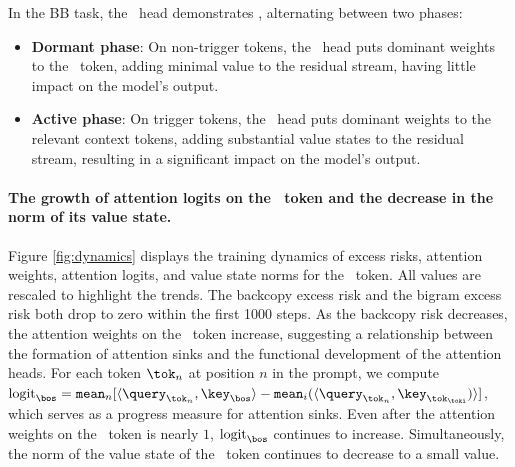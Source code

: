 \begin{claim}
\label{claim:active-dormant}
In the BB task, the \attn~head demonstrates \activedormant, alternating between two phases:
\begin{itemize}[leftmargin=2em]
\setlength\itemsep{0pt}
\item \textbf{Dormant phase}: On non-trigger tokens, the \attn~head puts dominant weights to the \bos~token, adding minimal value to the residual stream, having little impact on the model’s output.
\item \textbf{Active phase}: On trigger tokens, the \attn~head puts dominant weights to the relevant context tokens, adding substantial value states to the residual stream, resulting in a significant impact on the model’s output. 
\end{itemize}
\end{claim}

\paragraph{The growth of attention logits on the \bos~token and the decrease in the norm of its value state.} Figure \ref{fig:dynamics} displays the training dynamics of excess risks, attention weights, attention logits, and value state norms for the \bos~token. All values are rescaled to highlight the trends. The backcopy excess risk and the bigram excess risk both drop to zero within the first 1000 steps. As the backcopy risk decreases, the attention weights on the \bos~token increase, suggesting a relationship between the formation of attention sinks and the functional development of the attention heads. For each token $\tok_n$ at position $n$ in the prompt, we compute $\text{logit}_{\bos} = \mathtt{mean}_{n}[\langle \query_{\tok_n}, \key_\bos \rangle - \mathtt{mean}_{i}(\langle \query_{\tok_n}, \key_{\tok_\toki}) \rangle]$, which serves as a progress measure for attention sinks. Even after the attention weights on the \bos~token is nearly $1$, $\text{logit}_{\bos}$ continues to increase. Simultaneously, the norm of the value state of the \bos~token continues to decrease to a small value.

